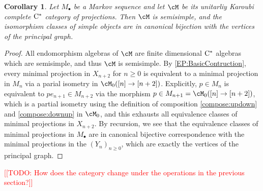 \documentclass[11pt]{article}
\theoremstyle{plain}
\newtheorem{cor}[thm]{Corollary}
\theoremstyle{definition}
\newcommand{\Cstar}{\rm{C^*}}
\newcommand{\nn}[1]{\textcolor{red}{[[#1]]}}
\begin{document}
\begin{cor}
\label{cor:SemisimpleProjectionCategory}
Let $M_\bullet$ be a Markov sequence and let $\cM$ be its unitarliy Karoubi complete $\Cstar$ category of projections.
Then $\cM$ is semisimple, and the isomorphism classes of simple objects are in canonical bijection with the vertices of the principal graph.
\end{cor}
\begin{proof}
All endomorphism algebras of $\cM$ are finite dimensional $\Cstar$ algebras which are semisimple, and thus $\cM$ is semisimple. By \ref{EP:BasicContruction}, every minimal projection in $X_{n+2}$ for $n\geq 0$ is equivalent to a minimal projection in $M_{n}$ via a parial isometry in $\cM_0([n] \to [n+2])$. 
Explicitly, $p\in M_n$ is equivalent to $p e_{n+1} \in M_{n+2}$ via the morphism $p\in M_{n+1} = \cM_0([n] \to [n+2])$, which is a partial isometry using the definition of composition \ref{compose:updown} and \ref{compose:downup} in $\cM_0$, and this exhausts all equivalence classes of minimal projections in $X_{n+2}$.
By recursion, we see that the equivalence classes of minimal projections in $M_\bullet$ are in canonical bijective correspondence with the minimal projections in the $(Y_n)_{n\geq 0}$, which are exactly the vertices of the principal graph.
\end{proof}

\nn{TODO: How does the category change under the operations in the previous section?}
\end{document}
